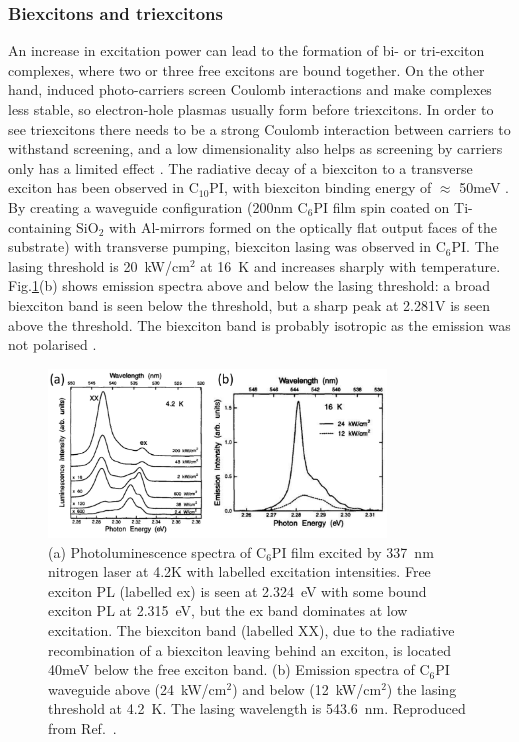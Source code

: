 \subsubsection{Biexcitons and triexcitons}
An increase in excitation power can lead to the formation of bi- or tri-exciton complexes, where two or three free excitons are bound together. On the other hand, induced photo-carriers screen Coulomb interactions and make complexes less stable, so electron-hole plasmas usually form before triexcitons. In order to see triexcitons there needs to be a strong Coulomb interaction between carriers to withstand screening, and a low dimensionality also helps as screening by carriers only has a limited effect \cite{Shimizu2006a}. The radiative decay of a biexciton to a transverse exciton has been observed in $\textrm{C}_{10}$PI, with biexciton binding energy of $\approx$ 50meV \cite{Ishihara1992}. By creating a waveguide configuration (200nm $\textrm{C}_{6}$PI film spin coated on Ti-containing Si$\textrm{O}_2$ with Al-mirrors formed on the optically flat output faces of the substrate) with transverse pumping, biexciton lasing was observed in $\textrm{C}_6$PI. The lasing threshold is 20~kW/$\textrm{cm}^2$ at 16~K and increases sharply with temperature. Fig.\ref{2Fig15}(b) shows emission spectra above and below the lasing threshold: a broad biexciton band is seen below the threshold, but a sharp peak at 2.281V is seen above the threshold. The biexciton band is probably isotropic as the emission was not polarised \cite{Kondo1998}.

\begin{figure}[h!]
\centering
\includegraphics[width=0.8\textwidth]{Fig15}
\caption{(a) Photoluminescence spectra of $\textrm{C}_{6}$PI film excited by 337~nm nitrogen laser at 4.2K with labelled excitation intensities. Free exciton PL (labelled ex) is seen at 2.324~eV with some bound exciton PL at 2.315~eV, but the ex band dominates at low excitation. The biexciton band (labelled XX), due to the radiative recombination of a biexciton leaving behind an exciton, is located 40meV below the free exciton band. (b) Emission spectra of $\textrm{C}_{6}$PI waveguide above (24~kW/$\textrm{cm}^2$) and below (12~kW/$\textrm{cm}^2$) the lasing threshold at 4.2~K. The lasing wavelength is 543.6~nm. Reproduced from Ref.\ \cite{Kondo1998}.}
\label{2Fig15}
\end{figure}

